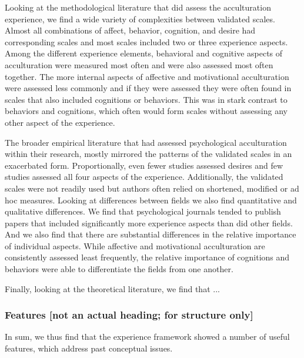 \documentclass[man, 12pt, a4paper]{apa7}
\begin{document}
Looking at the methodological literature that did assess the acculturation experience, we find a wide variety of complexities between validated scales. Almost all combinations of affect, behavior, cognition, and desire had corresponding scales and most scales included two or three experience aspects. Among the different experience elements, behavioral and cognitive aspects of acculturation were measured most often and were also assessed most often together. The more internal aspects of affective and motivational acculturation were assessed less commonly and if they were assessed they were often found in scales that also included cognitions or behaviors. This was in stark contrast to behaviors and cognitions, which often would form scales without assessing any other aspect of the experience.

The broader empirical literature that had assessed psychological acculturation within their research, mostly mirrored the patterns of the validated scales in an exacerbated form. Proportionally, even fewer studies assessed desires and few studies assessed all four aspects of the experience. Additionally, the validated scales were not readily used but authors often relied on shortened, modified or ad hoc measures. Looking at differences between fields we also find quantitative and qualitative differences. We find that psychological journals tended to publish papers that included significantly more experience aspects than did other fields. And we also find that there are substantial differences in the relative importance of individual aspects. While affective and motivational acculturation are consistently assessed least frequently, the relative importance of cognitions and behaviors were able to differentiate the fields from one another.

Finally, looking at the theoretical literature, we find that ...

\subsubsection{Features [not an actual heading; for structure only]}
In sum, we thus find that the experience framework showed a number of useful features, which address past conceptual issues. 
\end{document}

